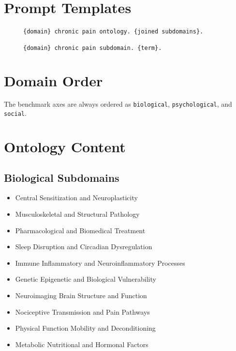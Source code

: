 \documentclass[11pt]{article}
\begin{document}
\section*{Prompt Templates}
\begin{description}
\item[] \texttt{\{domain\} chronic pain ontology. \{joined subdomains\}.}
\item[] \texttt{\{domain\} chronic pain subdomain. \{term\}.}
\end{description}

\section*{Domain Order}
The benchmark axes are always ordered as \texttt{biological}, \texttt{psychological}, and \texttt{social}.

\section*{Ontology Content}
\subsection*{Biological Subdomains}
\begin{itemize}
\item Central Sensitization and Neuroplasticity
\item Musculoskeletal and Structural Pathology
\item Pharmacological and Biomedical Treatment
\item Sleep Disruption and Circadian Dysregulation
\item Immune Inflammatory and Neuroinflammatory Processes
\item Genetic Epigenetic and Biological Vulnerability
\item Neuroimaging Brain Structure and Function
\item Nociceptive Transmission and Pain Pathways
\item Physical Function Mobility and Deconditioning
\item Metabolic Nutritional and Hormonal Factors
\end{itemize}
\end{document}

